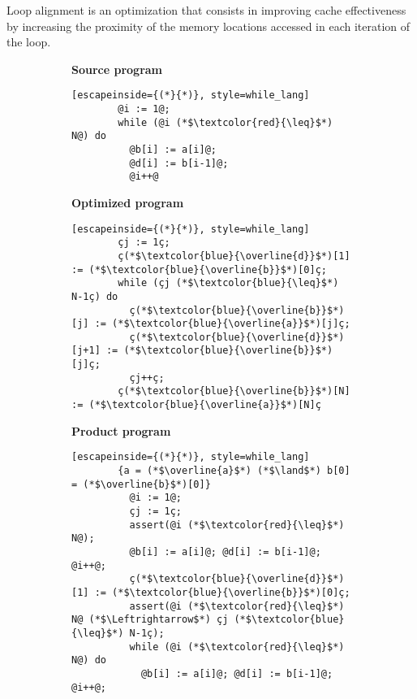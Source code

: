 Loop alignment is an optimization that consists in improving cache effectiveness by increasing the proximity of the memory locations accessed in each iteration of the loop.
\begin{figure}
  \centering
  \begin{subfigure}[b]{0.45\textwidth}
    \begin{minipage}[t]{\linewidth}
      \textbf{Source program}
      \begin{lstlisting}[escapeinside={(*}{*)}, style=while_lang]
        @i := 1@; 
        while (@i (*$\textcolor{red}{\leq}$*) N@) do
          @b[i] := a[i]@;
          @d[i] := b[i-1]@;
          @i++@
      \end{lstlisting}
    \end{minipage}
  \end{subfigure}
  \hfill
  \begin{subfigure}[b]{0.45\textwidth}
    \begin{minipage}[t]{\linewidth}
      \textbf{Optimized program}
      \begin{lstlisting}[escapeinside={(*}{*)}, style=while_lang]
        çj := 1ç;
        ç(*$\textcolor{blue}{\overline{d}}$*)[1] := (*$\textcolor{blue}{\overline{b}}$*)[0]ç;
        while (çj (*$\textcolor{blue}{\leq}$*) N-1ç) do
          ç(*$\textcolor{blue}{\overline{b}}$*)[j] := (*$\textcolor{blue}{\overline{a}}$*)[j]ç;
          ç(*$\textcolor{blue}{\overline{d}}$*)[j+1] := (*$\textcolor{blue}{\overline{b}}$*)[j]ç;
          çj++ç;
        ç(*$\textcolor{blue}{\overline{b}}$*)[N] := (*$\textcolor{blue}{\overline{a}}$*)[N]ç
      \end{lstlisting}
    \end{minipage}
  \end{subfigure}
  \hfill
  \begin{subfigure}[b]{0.9\textwidth}
    \begin{minipage}[t]{\linewidth}
      \textbf{Product program}
      \begin{lstlisting}[escapeinside={(*}{*)}, style=while_lang]
        {a = (*$\overline{a}$*) (*$\land$*) b[0] = (*$\overline{b}$*)[0]}
          @i := 1@; 
          çj := 1ç;
          assert(@i (*$\textcolor{red}{\leq}$*) N@);
          @b[i] := a[i]@; @d[i] := b[i-1]@; @i++@;
          ç(*$\textcolor{blue}{\overline{d}}$*)[1] := (*$\textcolor{blue}{\overline{b}}$*)[0]ç;
          assert(@i (*$\textcolor{red}{\leq}$*) N@ (*$\Leftrightarrow$*) çj (*$\textcolor{blue}{\leq}$*) N-1ç);
          while (@i (*$\textcolor{red}{\leq}$*) N@) do
            @b[i] := a[i]@; @d[i] := b[i-1]@; @i++@;

\end{lstlisting}
\end{minipage}
\end{subfigure}
\end{figure}
